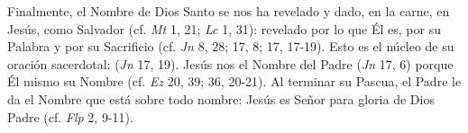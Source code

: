  Finalmente, el Nombre de Dios Santo se nos ha revelado y dado, en la carne, en Jesús, como Salvador (cf. \emph{Mt} 1, 21; \emph{Lc} 1, 31): revelado por lo que Él es, por su Palabra y por su Sacrificio (cf. \emph{Jn} 8, 28; 17, 8; 17, 17-19). Esto es el núcleo de su oración sacerdotal:  (\emph{Jn} 17, 19). Jesús nos  el Nombre del Padre (\emph{Jn} 17, 6) porque  Él mismo su Nombre (cf. \emph{Ez} 20, 39; 36, 20-21). Al terminar su Pascua, el Padre le da el Nombre que está sobre todo nombre: Jesús es Señor para gloria de Dios Padre (cf. \emph{Flp} 2, 9-11).